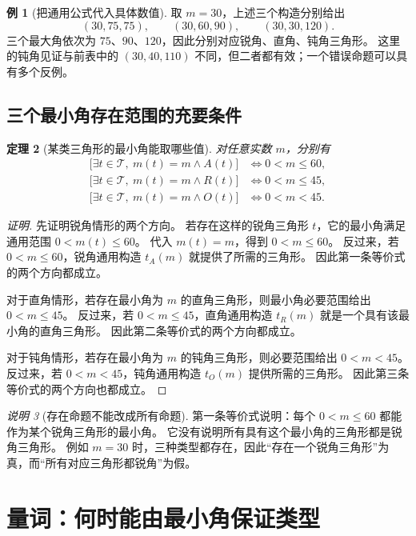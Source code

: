 \documentclass[UTF8,a4paper,zihao=-4,oneside,openany,fontset=fandol]{ctexbook}
\newtheorem{theorem}{定理}[chapter]
\theoremstyle{definition}
\newtheorem{example}[theorem]{例}
\theoremstyle{remark}
\newtheorem{remark}[theorem]{说明}
\begin{document}
\begin{example}[把通用公式代入具体数值]
取 $m=30$，上述三个构造分别给出
\[
(30,75,75),\qquad(30,60,90),\qquad(30,30,120).
\]
三个最大角依次为 $75$、$90$、$120$，因此分别对应锐角、直角、钝角三角形。
这里的钝角见证与前表中的 $(30,40,110)$ 不同，但二者都有效；一个错误命题可以具有多个反例。
\end{example}

\section{三个最小角存在范围的充要条件}

\begin{theorem}[某类三角形的最小角能取哪些值]
对任意实数 $m$，分别有
\begin{align*}
\bigl[\exists t\in\mathcal T,\ m(t)=m\land A(t)\bigr]
&\Longleftrightarrow0<m\le60,\\
\bigl[\exists t\in\mathcal T,\ m(t)=m\land R(t)\bigr]
&\Longleftrightarrow0<m\le45,\\
\bigl[\exists t\in\mathcal T,\ m(t)=m\land O(t)\bigr]
&\Longleftrightarrow0<m<45.
\end{align*}
\end{theorem}

\begin{proof}[证明]
先证明锐角情形的两个方向。
若存在这样的锐角三角形 $t$，它的最小角满足通用范围 $0<m(t)\le60$。
代入 $m(t)=m$，得到 $0<m\le60$。
反过来，若 $0<m\le60$，锐角通用构造 $t_A(m)$ 就提供了所需的三角形。
因此第一条等价式的两个方向都成立。

对于直角情形，若存在最小角为 $m$ 的直角三角形，则最小角必要范围给出 $0<m\le45$。
反过来，若 $0<m\le45$，直角通用构造 $t_R(m)$ 就是一个具有该最小角的直角三角形。
因此第二条等价式的两个方向都成立。

对于钝角情形，若存在最小角为 $m$ 的钝角三角形，则必要范围给出 $0<m<45$。
反过来，若 $0<m<45$，钝角通用构造 $t_O(m)$ 提供所需的三角形。
因此第三条等价式的两个方向也都成立。
\end{proof}

\begin{remark}[存在命题不能改成所有命题]
第一条等价式说明：每个 $0<m\le60$ 都能作为某个锐角三角形的最小角。
它没有说明所有具有这个最小角的三角形都是锐角三角形。
例如 $m=30$ 时，三种类型都存在，因此“存在一个锐角三角形”为真，而“所有对应三角形都锐角”为假。
\end{remark}

\chapter{量词：何时能由最小角保证类型}
\label{math:quantifiers}
\end{document}
